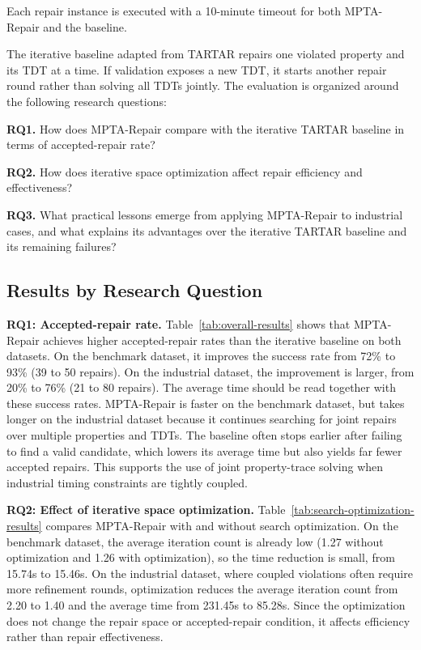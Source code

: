 Each repair instance is
executed with a 10-minute timeout for both MPTA-Repair and the baseline.

The iterative baseline adapted from TARTAR \cite{kolbl2019clock}
repairs one violated property and its TDT at a time. If validation
exposes a new TDT, it starts another repair round rather than solving
all TDTs jointly.
The evaluation is organized around the following research questions:

\noindent\textbf{RQ1.} How does MPTA-Repair compare with the iterative
TARTAR baseline in terms of accepted-repair rate?

\noindent\textbf{RQ2.} How does iterative space optimization affect
repair efficiency and effectiveness?

\noindent\textbf{RQ3.} What practical lessons emerge from applying
MPTA-Repair to industrial cases, and what explains its advantages over
the iterative TARTAR baseline and its remaining failures?

\subsection{Results by Research Question}



\noindent\textbf{RQ1: Accepted-repair rate.}
Table~\ref{tab:overall-results} shows that MPTA-Repair achieves higher
accepted-repair rates than the iterative baseline on both datasets. On
the benchmark dataset, it improves the success rate from 72\% to 93\%
(39 to 50 repairs). On the industrial dataset, the improvement is larger,
from 20\% to 76\% (21 to 80 repairs). The average time should be read
together with these success rates. MPTA-Repair is faster on the
benchmark dataset, but takes longer on the industrial dataset because it
continues searching for joint repairs over multiple properties and TDTs.
The baseline often stops earlier after failing to find a valid
candidate, which lowers its average time but also yields far fewer
accepted repairs. This supports the use of joint property-trace solving
when industrial timing constraints are tightly coupled.



\noindent\textbf{RQ2: Effect of iterative space optimization.}
Table~\ref{tab:search-optimization-results} compares MPTA-Repair with
and without search optimization. On the benchmark dataset, the average
iteration count is already low (1.27 without optimization and 1.26 with
optimization), so the time reduction is small, from 15.74s to 15.46s.
On the industrial dataset, where coupled violations often require more
refinement rounds, optimization reduces the average iteration count from
2.20 to 1.40 and the average time from 231.45s to 85.28s. Since the
optimization does not change the repair space or accepted-repair
condition, it affects efficiency rather than repair effectiveness.

